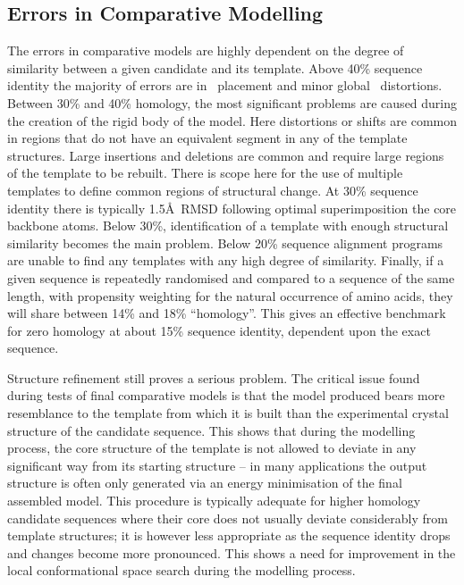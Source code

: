 \subsection{Errors in Comparative Modelling}

The errors in comparative models are highly dependent on the degree of similarity between a given candidate and its template. Above 40\% sequence identity the majority of errors are in \sidechain\ placement and minor global \mainchain\ distortions. Between 30\% and 40\% homology, the most significant problems are caused during the creation of the rigid body of the model.  Here distortions or shifts are common in regions that do not have an equivalent segment in any of the template structures. Large insertions and deletions are common and require large regions of the template to be rebuilt. There is scope here for the use of multiple templates to define common regions of structural change. At 30\% sequence identity there is typically 1.5\AA\ RMSD following optimal superimposition the core backbone atoms\cite{NATIVE:Chothia1986}.
Below 30\%, identification of a template with enough structural similarity becomes the main problem. Below 20\% sequence alignment programs are unable to find any templates with any high degree of similarity. Finally,
if a given sequence is repeatedly randomised and compared to a sequence of the same length, with propensity weighting for the natural occurrence of amino acids, they will share between 14\% and 18\% ``homology''. This gives an effective benchmark for zero homology at about 15\% sequence identity, dependent upon
the exact sequence.

Structure refinement still proves a serious problem.  
The critical issue found during tests of final comparative models is that the model produced bears more resemblance to the template from which it is built than the experimental crystal structure of the candidate sequence. This shows that during the modelling process, the core structure of the template is not allowed to deviate in any significant way from its starting structure -- in many applications the output structure is often only generated via an  energy minimisation of the final assembled model. This procedure is typically adequate for higher homology candidate sequences where their core does not usually deviate considerably from template structures; it is however less appropriate as the sequence identity drops and changes become more pronounced. This shows a need for improvement in the local conformational space search during the modelling process. 









